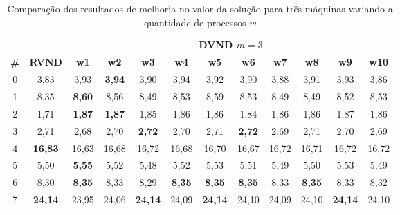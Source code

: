 \begin{table}[htbp]
\caption{Comparação dos resultados de melhoria no valor da solução para três máquinas variando a quantidade de processos $w$}
\begin{center}
\begin{tabular}{cccccccccccc}
\hline
\hline
\multicolumn{2}{c}{} &\multicolumn{10}{c}{\textbf{DVND $m=3$}} \\
\cline{3-12}
\textbf{\#} & \textbf{RVND}& \textbf{w1}& \textbf{w2}& \textbf{w3}& \textbf{w4}& \textbf{w5}& \textbf{w6}& \textbf{w7}& \textbf{w8}& \textbf{w9}& \textbf{w10} \\
\hline
0 & 3,83& 3,93& \textbf{3,94}& 3,90& 3,94& 3,92& 3,90& 3,88& 3,91& 3,93& 3,86 \\
1 & 8,35& \textbf{8,60}& 8,56& 8,49& 8,53& 8,59& 8,53& 8,49& 8,49& 8,52& 8,53 \\
2 & 1,71& \textbf{1,87}& \textbf{1,87}& 1,85& 1,86& 1,86& 1,84& 1,86& 1,86& 1,87& 1,86 \\
3 & 2,71& 2,68& 2,70& \textbf{2,72}& 2,70& 2,71& \textbf{2,72}& 2,69& 2,71& 2,70& 2,69 \\
4 &\textbf{16,83}&16,63&16,68&16,72&16,68&16,70&16,67&16,72&16,71&16,72&16,72 \\
5 & 5,50& \textbf{5,55}& 5,52& 5,48& 5,52& 5,53& 5,51& 5,49& 5,50& 5,53& 5,49 \\
6 & 8,30& \textbf{8,35}& 8,33& 8,29& \textbf{8,35}& \textbf{8,35}& \textbf{8,35}& 8,33& \textbf{8,35}& 8,33& 8,32 \\
7 &\textbf{24,14}&23,95&24,06&\textbf{24,14}&24,09&\textbf{24,14}&24,10&24,09&24,10&\textbf{24,14}&24,10 \\
\hline
\end{tabular}
\label{tab:rvndDvndN3imp}
\end{center}
\end{table}

